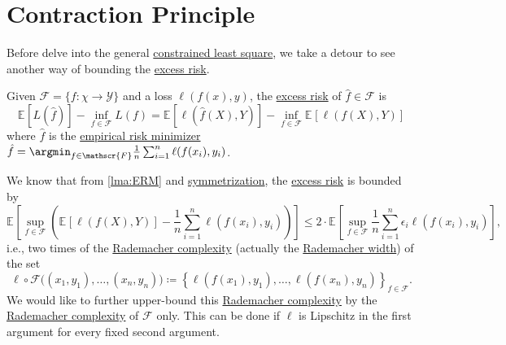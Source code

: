\section{Contraction Principle}
Before delve into the general \hyperref[prb:constrained-LS]{constrained least square}, we take a detour to see another way of bounding the \hyperref[def:excess-risk]{excess risk}.

\begin{prev}
	Given \(\mathscr{F} = \{ f\colon \chi \to \mathscr{Y} \} \) and a loss \(\ell (f(x), y)\), the \hyperref[def:excess-risk]{excess risk} of \(\hat{f} \in \mathscr{F} \) is
	\[
		\mathbb{E}_{}[L(\hat{f} ) ] - \inf _{f\in \mathscr{F} } L(f)
		= \mathbb{E}_{}[\ell (\hat{f} (X), Y) ] - \inf _{f\in \mathscr{F} } \mathbb{E}_{}\left[\ell (f(X), Y) \right]
	\]
	where \(\hat{f} \) is the \hyperref[prb:ERM]{empirical risk minimizer} \(\hat{f} = \argmin_{f\in \mathscr{F} } \frac{1}{n} \sum_{i=1}^{n} \ell (f(x_i), y_i)\).
\end{prev}

We know that from \autoref{lma:ERM} and \hyperref[lma:symmetrization]{symmetrization}, the \hyperref[def:excess-risk]{excess risk} is bounded by
\[
	\mathbb{E}_{}\left[\sup _{f\in \mathscr{F} } \left( \mathbb{E}_{}\left[\ell (f(X), Y) \right] - \frac{1}{n} \sum_{i=1}^{n} \ell (f(x_i), y_i) \right) \right]
	\leq 2 \cdot \mathbb{E}_{}\left[\sup _{f\in \mathscr{F} } \frac{1}{n} \sum_{i=1}^{n} \epsilon _i \ell (f(x_i), y_i) \right] ,
\]
i.e., two times of the \hyperref[def:Rademacher-complexity]{Rademacher complexity} (actually the \hyperref[def:Rademacher-width]{Rademacher width}) of the set
\[
	\ell \circ \mathscr{F} \big( (x_1, y_1), \dots , (x_n, y_n) \big)
	\coloneqq \left\{ \ell (f(x_1), y_1), \dots , \ell (f(x_n), y_n) \right\} _{f\in \mathscr{F} }.
\]
We would like to further upper-bound this \hyperref[def:Rademacher-complexity]{Rademacher complexity} by the \hyperref[def:Rademacher-complexity]{Rademacher complexity} of \(\mathscr{F} \) only. This can be done if \(\ell \) is Lipschitz in the first argument for every fixed second argument.

